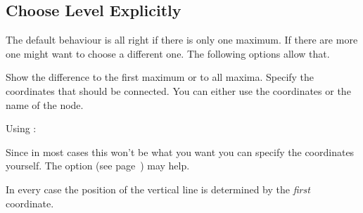 \documentclass[load-preamble+]{cnltx-doc}
\begin{document}
\subsection{Choose Level Explicitly}
The default behaviour is all right if there is only one maximum.  If there are
more one might want to choose a different one.  The following options allow
that.
\begin{options}
    Show the difference to the first maximum or to all maxima.
    Specify the coordinates that should be connected.  You can either use the
    coordinates  or the name  of
    the node.
\end{options}

Using :
\begin{example}
  \begin{endiagram}
    \ShowEa[max=all]
  \end{endiagram}
\end{example}

Since in most cases this won't be what you want you can specify the
coordinates yourself.  The option  (see
page~\pageref{key:debug}) may help.
\begin{example}
  \begin{endiagram}[debug]
    \ShowEa
  \end{endiagram}
  \quad
   \begin{endiagram}
    \ShowEa[from={(0,1) to (6,4)}]
  \end{endiagram}

  \begin{endiagram}
    \ShowEa[from={(N1-1) to (N1-3)}]
  \end{endiagram}
  \quad
  \begin{endiagram}
    \ShowEa[from={(N1-5) to (N1-4)}]
  \end{endiagram}
\end{example}
In every case the position of the vertical line is determined by the \emph{first}
coordinate.
\end{document}
